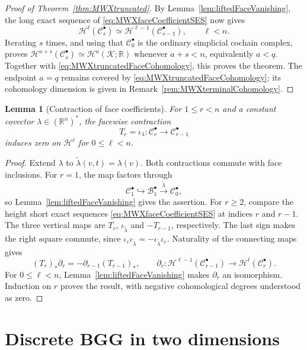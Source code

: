 \documentclass[10pt]{amsart}
\numberwithin{equation}{section}
\newtheorem{lemma}[theorem]{Lemma}
\begin{document}
\begin{proof}[Proof of Theorem~\ref{thm:MWXtruncated}]
By Lemma~\ref{lem:liftedFaceVanishing}, the long exact sequence of \eqref{eq:MWXfaceCoefficientSES} now gives
\[
\mathscr H^\ell(\mathcal C_s^\bullet)
\simeq \mathscr H^{\ell-1}(\mathcal C_{s-1}^\bullet),\qquad \ell<n.
\]
Iterating $s$ times, and using that $\mathcal C_0^\bullet$ is the ordinary
simplicial cochain complex, proves
$\mathscr H^{a+s}(\mathcal C_s^\bullet)\simeq \mathscr H^a(\mathcal K;\mathbb R)$ whenever
$a+s<n$, equivalently $a<q$. Together with
\eqref{eq:MWXtruncatedFaceCohomology}, this proves the theorem.
The endpoint $a=q$ remains covered by \eqref{eq:MWXtruncatedFaceCohomology};
its cohomology dimension is given in Remark~\ref{rem:MWXterminalCohomology}.
\end{proof}


\begin{lemma}[Contraction of face coefficients]\label{lem:faceContractionZero}
For $1\leq r<n$ and a constant covector $\lambda\in(\mathbb R^n)^*$,
the facewise contraction
\[
T_r=\iota_\lambda:\mathcal C_r^\bullet\longrightarrow
\mathcal C_{r-1}^\bullet
\]
induces zero on $\mathscr H^\ell$ for $0\leq\ell<n$.
\end{lemma}
\begin{proof}
Extend $\lambda$ to $\widetilde\lambda(v,t)=\lambda(v)$.
Both contractions commute with face inclusions.
For $r=1$, the map factors through
\[
\mathcal C_1^\bullet\hookrightarrow\mathcal B_1^\bullet
\xrightarrow{\widetilde\lambda}\mathcal C_0^\bullet,
\]
so Lemma~\ref{lem:liftedFaceVanishing} gives the assertion.
For $r\geq2$, compare the height short exact sequences
\eqref{eq:MWXfaceCoefficientSES} at indices $r$ and $r-1$.
The three vertical maps are $T_r$, $\iota_{\widetilde\lambda}$ and
$-T_{r-1}$, respectively. The last sign makes the right square commute,
since $\iota_\varepsilon\iota_{\widetilde\lambda}
=-\iota_{\widetilde\lambda}\iota_\varepsilon$.
Naturality of the connecting maps gives
\[
(T_r)_*\partial_r=-\partial_{r-1}(T_{r-1})_* ,\qquad
\partial_r:\mathscr H^{\ell-1}(\mathcal C_{r-1}^\bullet)
\longrightarrow \mathscr H^\ell(\mathcal C_r^\bullet).
\]
For $0\leq\ell<n$, Lemma~\ref{lem:liftedFaceVanishing} makes $\partial_r$
an isomorphism. Induction on $r$ proves the result, with negative
cohomological degrees understood as zero.
\end{proof}


\section{Discrete BGG in two dimensions}\label{sec:BGG2d}
\end{document}
